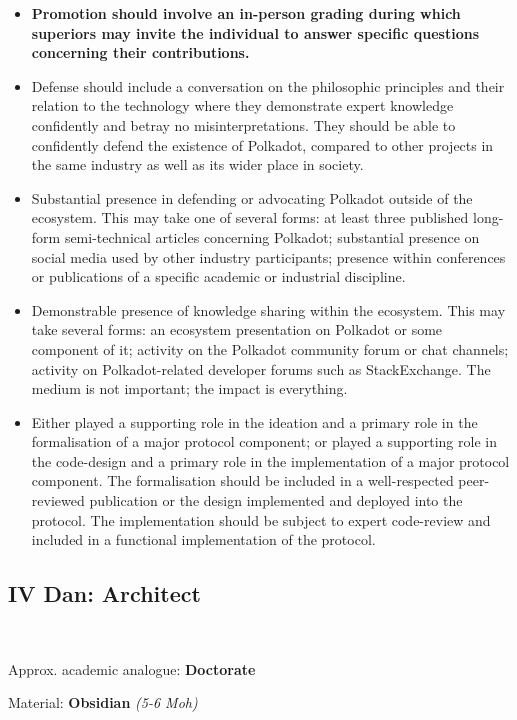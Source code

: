 \documentclass[9pt,oneside]{amsart}
\begin{document}
\begin{itemize}
\item \textbf{Promotion should involve an in-person grading during which superiors may invite the individual to answer specific questions concerning their contributions.}
\item Defense should include a conversation on the philosophic principles and their relation to the technology where they demonstrate expert knowledge confidently and betray no misinterpretations. They should be able to confidently defend the existence of Polkadot, compared to other projects in the same industry as well as its wider place in society.
\item Substantial presence in defending or advocating Polkadot outside of the ecosystem. This may take one of several forms: at least three published long-form semi-technical articles concerning Polkadot; substantial presence on social media used by other industry participants; presence within conferences or publications of a specific academic or industrial discipline.
\item Demonstrable presence of knowledge sharing within the ecosystem. This may take several forms: an ecosystem presentation on Polkadot or some component of it; activity on the Polkadot community forum or chat channels; activity on Polkadot-related developer forums such as StackExchange. The medium is not important; the impact is everything.
\item Either played a supporting role in the ideation and a primary role in the formalisation of a major protocol component; or played a supporting role in the code-design and a primary role in the implementation of a major protocol component. The formalisation should be included in a well-respected peer-reviewed publication or the design implemented and deployed into the protocol. The implementation should be subject to expert code-review and included in a functional implementation of the protocol.
\end{itemize}

\subsection{IV Dan: Architect}\label{iv-dan-architect}~\\


Approx. academic analogue: \textbf{Doctorate}

Material: \textbf{Obsidian} \emph{(5-6 Moh)}
\end{document}
